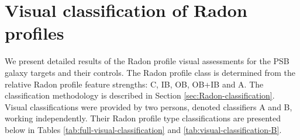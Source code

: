 \onecolumn

\section{Visual classification of Radon profiles}
\label{sec:visual-classification-tables}

We present detailed results of the Radon profile visual assessments for the PSB galaxy targets and their controls. The Radon profile class is determined from the relative Radon profile feature strengths: C, IB, OB, OB+IB and A. The classification methodology is described in Section \ref{sec:Radon-classification}. Visual classifications were provided by two persons, denoted classifiers A and B, working independently. Their Radon profile type classifications are presented below in Tables \ref{tab:full-visual-classification} and \ref{tab:visual-classification-B}. 



